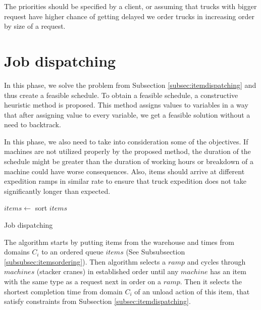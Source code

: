 \documentclass{ctuthesis}
\begin{document}
The priorities should be specified by a client, or assuming that trucks with bigger request have higher chance of getting delayed we order trucks in increasing order by size of a request.

\section{Job dispatching}

In this phase, we solve the problem from Subsection \ref{subsec:itemdispatching} and thus create a feasible schedule.
To obtain a feasible schedule, a constructive heuristic method is proposed. This method assigns values to variables in a way that after assigning value to every variable, we get a feasible solution without a need to backtrack.

In this phase, we also need to take into consideration some of the objectives. If machines are not utilized properly by the proposed method, the duration of the schedule might be greater than the duration of working hours or breakdown of a machine could have worse consequences. Also, items should arrive at different expedition ramps in similar rate to ensure that truck expedition does not take significantly longer than expected.
 
\begin{algorithm}[H]
\SetAlgoLined
{}
  $items \leftarrow$ sort $items$\;
\caption{Job dispatching}
\end{algorithm}

The algorithm starts by putting items from the warehouse and times from domains $C_i$ to an ordered queue $items$ (See Subsubsection \ref{subsubsec:itemsordering}). Then algorithm selects a $ramp$ and cycles through $machines$ (stacker cranes) in established order until any $machine$ has an item with the same type as a request next in order on a $ramp$. Then it selects the shortest completion time from domain $C_i$ of an unload action of this item, that satisfy constraints from Subsection \ref{subsec:itemdispatching}. 
\end{document}
